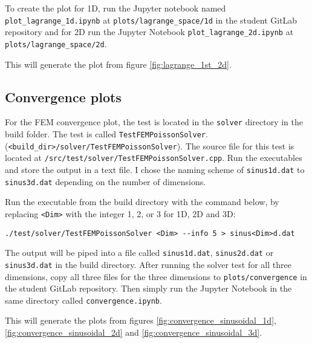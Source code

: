 To create the plot for 1D, run the Jupyter notebook named \texttt{plot\_lagrange\_1d.ipynb} at \texttt{plots/lagrange\_space/1d}
in the student GitLab repository
and for 2D run the Jupyter Notebook \texttt{plot\_lagrange\_2d.ipynb} at \texttt{plots/lagrange\_space/2d}.

This will generate the plot from figure \ref{fig:lagrange_1st_2d}.

\subsection{Convergence plots}

For the FEM convergence plot, the test is located in the \texttt{solver} directory in the build folder.
The test is called \texttt{TestFEMPoissonSolver}. (\texttt{<build\_dir>/solver/TestFEMPoissonSolver}).
The source file for this test is located at \texttt{/src/test/solver/TestFEMPoissonSolver.cpp}.
Run the executables and store the output in a text file. I chose the naming scheme of \texttt{sinus1d.dat} to \texttt{sinus3d.dat}
depending on the number of dimensions.

Run the executable from the build directory with the command below,
by replacing \texttt{<Dim>} with the integer 1, 2, or 3 for 1D, 2D and 3D:
\begin{verbatim}
./test/solver/TestFEMPoissonSolver <Dim> --info 5 > sinus<Dim>d.dat
\end{verbatim}

The output will be piped into a file called \texttt{sinus1d.dat}, \texttt{sinus2d.dat} or \texttt{sinus3d.dat} in the build directory.
After running the solver test for all three dimensions,
copy all three files for the three dimensions to \texttt{plots/convergence} in the student GitLab repository.
Then simply run the Jupyter Notebook in the same directory called \texttt{convergence.ipynb}.

This will generate the plots from figures \ref{fig:convergence_sinusoidal_1d}, \ref{fig:convergence_sinusoidal_2d} and \ref{fig:convergence_sinusoidal_3d}.

